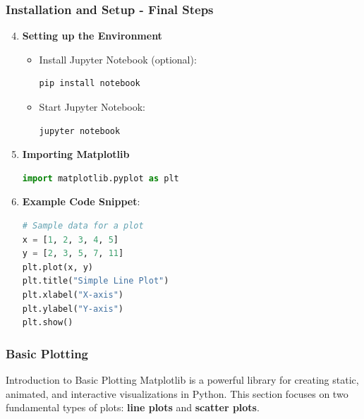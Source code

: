 \documentclass{beamer}
\begin{document}
\begin{frame}[fragile]
    \frametitle{Installation and Setup - Final Steps}
    \begin{enumerate}
        \setcounter{enumi}{3} %
        \item \textbf{Setting up the Environment}
            \begin{itemize}
                \item Install Jupyter Notebook (optional):
                \begin{lstlisting}[language=bash]
pip install notebook
                \end{lstlisting}
                \item Start Jupyter Notebook:
                \begin{lstlisting}[language=bash]
jupyter notebook
                \end{lstlisting}
            \end{itemize}
        
        \item \textbf{Importing Matplotlib}
            \begin{lstlisting}[language=python]
import matplotlib.pyplot as plt
            \end{lstlisting}
        
        \item \textbf{Example Code Snippet}:
            \begin{lstlisting}[language=python]
# Sample data for a plot
x = [1, 2, 3, 4, 5]
y = [2, 3, 5, 7, 11]
plt.plot(x, y)
plt.title("Simple Line Plot")
plt.xlabel("X-axis")
plt.ylabel("Y-axis")
plt.show()
            \end{lstlisting}
    \end{enumerate}
\end{frame}

\begin{frame}
    \frametitle{Basic Plotting}
    \begin{block}{Introduction to Basic Plotting}
        Matplotlib is a powerful library for creating static, animated, and interactive visualizations in Python. 
        This section focuses on two fundamental types of plots: \textbf{line plots} and \textbf{scatter plots}.
    \end{block}
\end{frame}
\end{document}
